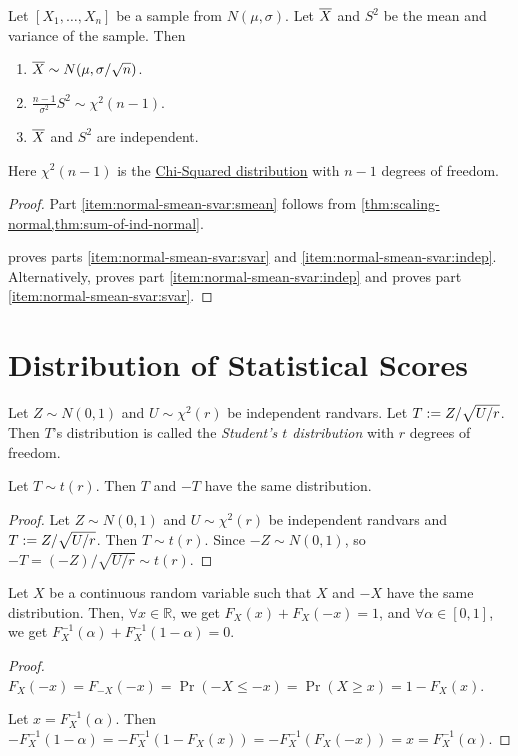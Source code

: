 \documentclass[a4paper, 12pt, fleqn]{article}
\begin{document}
\begin{theorem}
\label{thm:normal-smean-svar}
Let $[X_1, \ldots, X_n]$ be a sample from $N(\mu, \sigma)$.
Let $\overline{X}$ and $S^2$ be the mean and variance of the sample. Then
\begin{enumerate}
\item\label{item:normal-smean-svar:smean}$\overline{X} \sim N(\mu, \sigma/\sqrt{n})$.
\item\label{item:normal-smean-svar:svar}$\frac{n-1}{\sigma^2}S^2 \sim \chi^2(n-1)$.
\item\label{item:normal-smean-svar:indep}$\overline{X}$ and $S^2$ are independent.
\end{enumerate}
Here $\chi^2(n-1)$ is the
\href{https://en.wikipedia.org/wiki/Chi-squared_distribution}{Chi-Squared distribution}
with $n-1$ degrees of freedom.
\end{theorem}
\begin{proof}
Part \ref{item:normal-smean-svar:smean} follows from \cref{thm:scaling-normal,thm:sum-of-ind-normal}.

\cite{duke.stat.mean-var-indep} proves parts \ref{item:normal-smean-svar:svar}
and \ref{item:normal-smean-svar:indep}.
Alternatively, \cite{se.math.50598} proves part \ref{item:normal-smean-svar:indep}
and \cite{psu.stat414.svar} proves part \ref{item:normal-smean-svar:svar}.
\end{proof}

\section{Distribution of Statistical Scores}

\begin{definition}
Let $Z \sim N(0, 1)$ and $U \sim \chi^2(r)$ be independent randvars.
Let $T := Z/\sqrt{U/r}$. Then $T$'s distribution is called the
\emph{Student's $t$ distribution} with $r$ degrees of freedom.
\end{definition}

\begin{lemma}
Let $T \sim t(r)$. Then $T$ and $-T$ have the same distribution.
\end{lemma}
\begin{proof}
Let $Z \sim N(0, 1)$ and $U \sim \chi^2(r)$ be independent randvars
and $T := Z/\sqrt{U/r}$. Then $T \sim t(r)$.
Since $-Z \sim N(0, 1)$, so $-T = (-Z)/\sqrt{U/r} \sim t(r)$.
\end{proof}

\begin{lemma}
Let $X$ be a continuous random variable such that $X$ and $-X$ have the same distribution.
Then, $\forall x \in \mathbb{R}$, we get $F_X(x) + F_X(-x) = 1$,
and $\forall \alpha \in [0, 1]$, we get $F_X^{-1}(\alpha) + F_X^{-1}(1-\alpha) = 0$.
\end{lemma}
\begin{proof}
$F_X(-x) = F_{-X}(-x) = \Pr(-X \le -x) = \Pr(X \ge x)
= 1 - F_X(x)$.

Let $x = F_X^{-1}(\alpha)$. Then
\\ $-F_X^{-1}(1-\alpha) = -F_X^{-1}(1 - F_X(x))
= -F_X^{-1}(F_X(-x)) = x = F_X^{-1}(\alpha)$.
\end{proof}
\end{document}
